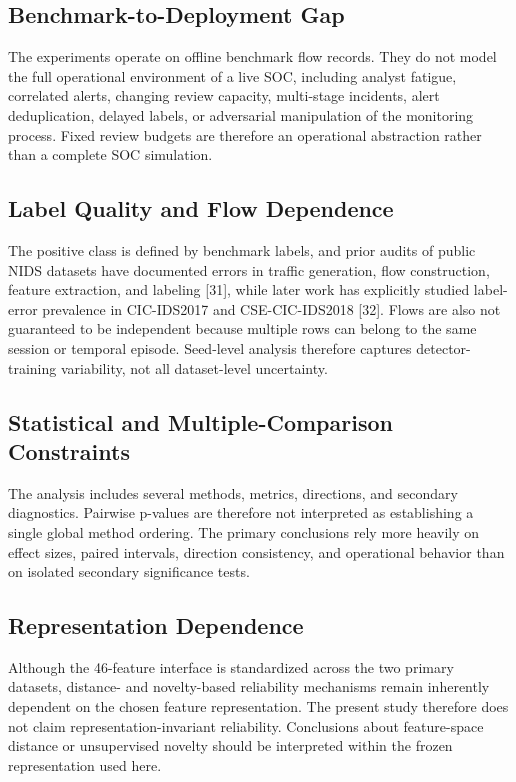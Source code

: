 \documentclass[conference]{IEEEtran}
\begin{document}
\subsection{Benchmark-to-Deployment Gap}

The experiments operate on offline benchmark flow records. They do not model the full operational environment of a live SOC, including analyst fatigue, correlated alerts, changing review capacity, multi-stage incidents, alert deduplication, delayed labels, or adversarial manipulation of the monitoring process. Fixed review budgets are therefore an operational abstraction rather than a complete SOC simulation.

\subsection{Label Quality and Flow Dependence}

The positive class is defined by benchmark labels, and prior audits of public NIDS datasets have documented errors in traffic generation, flow construction, feature extraction, and labeling [31], while later work has explicitly studied label-error prevalence in CIC-IDS2017 and CSE-CIC-IDS2018 [32]. Flows are also not guaranteed to be independent because multiple rows can belong to the same session or temporal episode. Seed-level analysis therefore captures detector-training variability, not all dataset-level uncertainty.

\subsection{Statistical and Multiple-Comparison Constraints}

The analysis includes several methods, metrics, directions, and secondary diagnostics. Pairwise p-values are therefore not interpreted as establishing a single global method ordering. The primary conclusions rely more heavily on effect sizes, paired intervals, direction consistency, and operational behavior than on isolated secondary significance tests.

\subsection{Representation Dependence}

Although the 46-feature interface is standardized across the two primary datasets, distance- and novelty-based reliability mechanisms remain inherently dependent on the chosen feature representation. The present study therefore does not claim representation-invariant reliability. Conclusions about feature-space distance or unsupervised novelty should be interpreted within the frozen representation used here.
\end{document}

